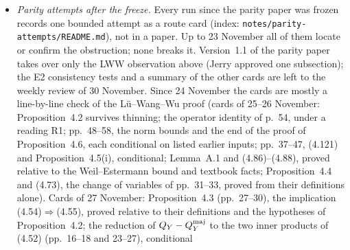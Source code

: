 \documentclass[11pt]{amsart}
\theoremstyle{definition}
\theoremstyle{remark}
\newcommand{\lbl}[1]{\textup{\textsc{#1}}}
\begin{document}
\begin{sloppypar}
\begin{itemize}
twisted Type~I input at small level; the Siegel-zero world; and small
corrections to the literature (Polymath8b Remark~8.1 and Proposition~6.5, a
constant in a 2019 preprint). Nothing in it breaks the parity barrier.
It makes no claim of progress on the twin prime conjecture, which is open.
Version~1.1 (23 Nov 2026) adds one subsection (and nothing else): the preprint of L\"u,
Wang and Wu (arXiv:2610.20242) claims (\lbl{Claimed}) $\sum_{p\le x}\mu(p+2)=o(\pi(x))$, a
model case of the parity problem; we have not verified it. For targets of the form
$\prod_iV_i^{-1}\sum_{a\mid N}g(N/a)$ their Type~II step sees $g$ only through its
boundedness, and their Type~I sums only through its distribution in reduced classes to moduli
$x^{2/5+o(1)}$. Hence, in outline and conditional on their Propositions~4.2 and~5.3
(\lbl{Proved here}; audited twice), there are $\gg x/(\log x)^2$ primes $p\in(x,2x]$ with
$p+2=a\ell$, $\ell$ prime, $a\le\exp(O((\log x)^{1/5}))$. The best unconditional exponent we
know of is $0.677$ (Baker--Harman, as quoted in the sources we read; \cite{BH98} not opened).
This is a consistency observation on their Propositions~4.2 and~5.3, not an error found, and it
does not bring twin primes closer (twins are the case $K=0$).
\item \emph{Parity attempts after the freeze.} Every run since the parity paper was frozen
records one bounded attempt as a route card (index: \texttt{notes/parity-attempts/README.md}),
not in a paper. Up to 23 November all of them locate or confirm the obstruction; none breaks
it. Version~1.1 of the parity paper takes over only the LWW observation above (Jerry
approved one subsection); the E2 consistency tests and a summary of the other cards are left to
the weekly review of 30 November. Since 24 November the cards are mostly a line-by-line check of the L\"u--Wang--Wu proof
(cards of 25--26 November: Proposition~4.2 survives thinning; the operator identity of p.~54, under a reading R1;
pp.~48--58, the norm bounds and the end of the proof of Proposition~4.6, each conditional on listed earlier inputs;
pp.~37--47, (4.121) and Proposition~4.5(i), conditional; Lemma~A.1 and (4.86)--(4.88), proved relative to the
Weil--Estermann bound and textbook facts; Proposition~4.4 and (4.73), the change of variables of pp.~31--33, proved
from their definitions alone). Cards of 27 November: Proposition~4.3 (pp.~27--30), the implication (4.54)$\Rightarrow$(4.55), proved relative to their
definitions and the hypotheses of Proposition~4.2; the reduction of $Q_Y-Q_Y^{\rm maj}$ to the two inner products of (4.52) (pp.~16--18 and 23--27), conditional

\end{itemize}
\end{sloppypar}
\end{document}
